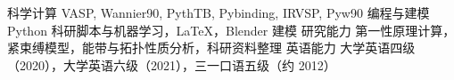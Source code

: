 
\begin{cvskills}
  \cvskill
    {科学计算}
    {VASP, Wannier90, PythTB, Pybinding, IRVSP, Pyw90}
  \cvskill
    {编程与建模}
    {Python 科研脚本与机器学习，LaTeX，Blender 建模}
  \cvskill
    {研究能力}
    {第一性原理计算，紧束缚模型，能带与拓扑性质分析，科研资料整理}
  \cvskill
    {英语能力}
    {大学英语四级（2020），大学英语六级（2021），三一口语五级（约 2012）}
\end{cvskills}
